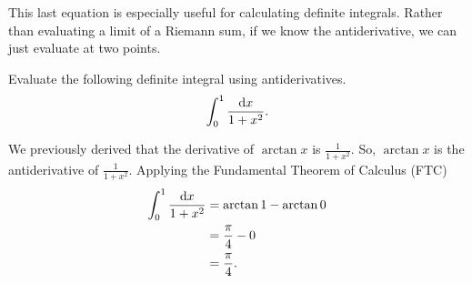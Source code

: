 This last equation is especially useful for calculating definite integrals.
Rather than evaluating a limit of a Riemann sum, if we know the antiderivative, we can just evaluate at two points.

\begin{example}
	Evaluate the following definite integral using antiderivatives.
	\begin{equation*}
		\int_{0}^{1}{\frac{\mathrm{d} x}{1+x^2}}.
	\end{equation*}
\end{example}
\begin{answer}
	We previously derived that the derivative of $\arctan{x}$ is $\frac{1}{1+x^2}$.
	So, $\arctan{x}$ is the antiderivative of $\frac{1}{1+x^2}$.
	Applying the Fundamental Theorem of Calculus (FTC)
	\begin{align*}
		\int_{0}^{1}{\frac{\mathrm{d} x}{1+x^2}} &= \arctan{1} - \arctan{0} \\
		&= \frac{\pi}{4} - 0 \\
		&= \frac{\pi}{4}.
	\end{align*} 
\end{answer}